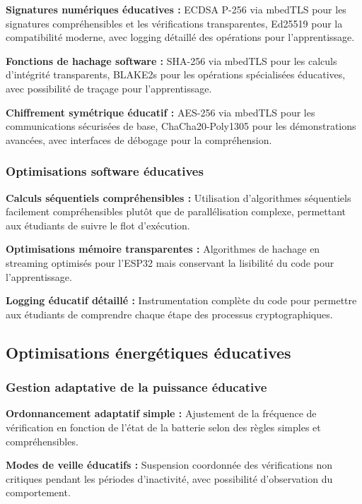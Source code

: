 \textbf{Signatures numériques éducatives :} ECDSA P-256 via mbedTLS pour les signatures compréhensibles et les vérifications transparentes, Ed25519 pour la compatibilité moderne, avec logging détaillé des opérations pour l'apprentissage.

\textbf{Fonctions de hachage software :} SHA-256 via mbedTLS pour les calculs d'intégrité transparents, BLAKE2s pour les opérations spécialisées éducatives, avec possibilité de traçage pour l'apprentissage.

\textbf{Chiffrement symétrique éducatif :} AES-256 via mbedTLS pour les communications sécurisées de base, ChaCha20-Poly1305 pour les démonstrations avancées, avec interfaces de débogage pour la compréhension.

\subsubsection{Optimisations software éducatives}

\textbf{Calculs séquentiels compréhensibles :} Utilisation d'algorithmes séquentiels facilement compréhensibles plutôt que de parallélisation complexe, permettant aux étudiants de suivre le flot d'exécution.

\textbf{Optimisations mémoire transparentes :} Algorithmes de hachage en streaming optimisés pour l'ESP32 mais conservant la lisibilité du code pour l'apprentissage.

\textbf{Logging éducatif détaillé :} Instrumentation complète du code pour permettre aux étudiants de comprendre chaque étape des processus cryptographiques.

\subsection{Optimisations énergétiques éducatives}

\subsubsection{Gestion adaptative de la puissance éducative}

\textbf{Ordonnancement adaptatif simple :} Ajustement de la fréquence de vérification en fonction de l'état de la batterie selon des règles simples et compréhensibles.

\textbf{Modes de veille éducatifs :} Suspension coordonnée des vérifications non critiques pendant les périodes d'inactivité, avec possibilité d'observation du comportement.

